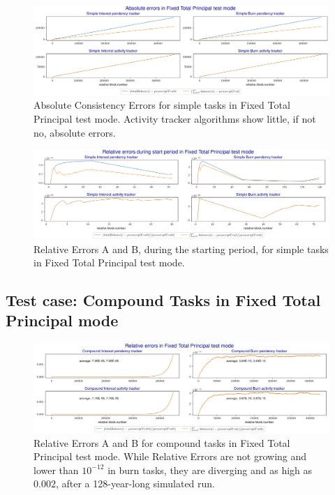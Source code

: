 \documentclass{article}
\begin{document}
\begin{figure}[H]
  \centering
  \includegraphics[width=5.3in]{images/6.3_fixed_sim_absolute.jpg}
  \caption{Absolute Consistency Errors for simple tasks 
  in Fixed Total Principal test mode. Activity tracker algorithms 
  show little, if not no, absolute errors.
  }
  \label{fig:fixed_sim_absolute_case}
\end{figure}

\begin{figure}[H]
  \centering
  \includegraphics[width=5.3in]{images/6.3_fixed_sim_relative_start.jpg}
  \caption{Relative Errors A and B, during the starting period, for simple tasks 
  in Fixed Total Principal test mode.
  }
  \label{fig:fixed_sim_relative_start_case}
\end{figure}

\subsection{Test case: Compound Tasks in Fixed Total Principal mode}

\begin{figure}[H]
  \centering
  \includegraphics[width=5.3in]{images/6.3_fixed_com_relative.jpg}
  \caption{Relative Errors A and B for compound tasks 
  in Fixed Total Principal test mode. While Relative Errors are 
  not growing and lower than $10^{-12}$ in burn tasks, they are diverging  
  and as high as $0.002$, after a 128-year-long simulated run. 
  }
  \label{fig:fixed_com_relative_case}
\end{figure}
\end{document}
